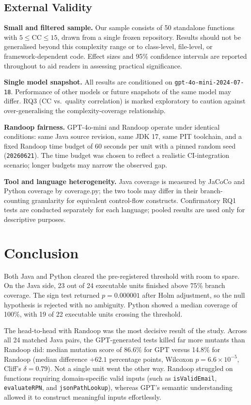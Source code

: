 \documentclass[conference]{IEEEtran}
\begin{document}
\subsection{External Validity}

\textbf{Small and filtered sample.}
Our sample consists of 50 standalone functions with $5 \le \text{CC} \le 15$,
drawn from a single frozen repository.
Results should not be generalised beyond this complexity range or to
class-level, file-level, or framework-dependent code.
Effect sizes and 95\% confidence intervals are reported throughout to aid
readers in assessing practical significance.

\textbf{Single model snapshot.}
All results are conditioned on \texttt{gpt-4o-mini-2024-07-18}.
Performance of other models or future snapshots of the same model may differ.
RQ3 (CC vs.\ quality correlation) is marked exploratory to caution against
over-generalising the complexity-coverage relationship.

\textbf{Randoop fairness.}
GPT-4o-mini and Randoop operate under identical conditions: same Java source
revision, same JDK 17, same PIT toolchain, and a fixed Randoop time budget
of 60 seconds per unit with a pinned random seed (\texttt{20260621}).
The time budget was chosen to reflect a realistic CI-integration scenario;
longer budgets may narrow the observed gap.

\textbf{Tool and language heterogeneity.}
Java coverage is measured by JaCoCo and Python coverage by coverage.py;
the two tools may differ in their branch-counting granularity for equivalent
control-flow constructs.
Confirmatory RQ1 tests are conducted separately for each language; pooled results
are used only for descriptive purposes.


\section{Conclusion}
\label{sec:conclusion}

Both Java and Python cleared the pre-registered threshold with room to spare. On the Java side, 23 out of 24 executable units finished above 75\% branch coverage. The sign test returned $p = 0.000001$ after Holm adjustment, so the null hypothesis is rejected with no ambiguity. Python showed a median coverage of 100\%, with 19 of 22 executable units crossing the threshold.

The head-to-head with Randoop was the most decisive result of the study. Across all 24 matched Java pairs, the GPT-generated tests killed far more mutants than Randoop did: median mutation score of 86.6\% for GPT versus 14.8\% for Randoop (median difference $+62.1$ percentage points, Wilcoxon $p = 6.6 \times 10^{-5}$, Cliff's $\delta = 0.79$). Not a single unit went the other way. Randoop struggled on functions requiring domain-specific valid inputs (such as \texttt{isValidEmail}, \texttt{evaluateRPN}, and \texttt{jsonPathLookup}), whereas GPT's semantic understanding allowed it to construct meaningful inputs effortlessly.
\end{document}
